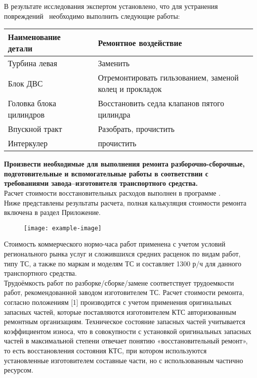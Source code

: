 %
%
%
В результате исследования   экспертом установлено, что для устранения повреждений  \, необходимо  выполнить следующие  работы:
\begin{center}
	\begin{tabulary}{\textwidth}{LCL}
\hline 
\textbf{Наименование детали}      &   & \textbf{Ремонтное воздействие}\\
\hline    
Турбина левая     &   &    Заменить\\
Блок ДВС    &   &    Отремонтировать гильзованием, заменой колец и прокладок \\
Головка блока цилиндров & & Восстановить седла клапанов пятого цилиндра \\
Впускной тракт & &    Разобрать, прочистить\\
Интеркулер   & &     прочистить\\
 

	\end{tabulary}  
\end{center}
\renewcommand\baselinestretch{1.2}\small\normalsize
%
\textbf{Произвести  необходимые для выполнения  ремонта разборочно-сборочные, подготовительные и вспомогательные работы в соответствии с требованиями завода–изготовителя транспортного средства.}\\
%
Расчет стоимости восстановительных расходов выполнен в программе \auda. \\ Ниже представлены результаты расчета, полная калькуляция стоимости ремонта включена в раздел Приложение.
\begin{figure}[H]
	\centering
	\texttt{[image: example-image]}
\end{figure}
\medskip
Стоимость коммерческого нормо-часа работ применена  с учетом условий регионального рынка услуг и сложившихся средних расценок по видам работ, типу ТС, а также по маркам и моделям ТС  и   составляет  1300 р/ч для данного транспортного средства. \\
Трудоёмкость работ по разборке/сборке/замене  соответствует трудоемкости работ, рекомендованной заводом изготовителем ТС. 
Расчет стоимости ремонта, согласно положениям [1] производится с учетом  применения оригинальных запасных частей, которые поставляются изготовителем КТС авторизованным ремонтным организациям. Техническое состояние запасных частей учитывается коэффициентом износа, что в совокупности с установкой оригинальных запасных частей в максимальной степени отвечает понятию «восстановительный ремонт», то есть восстановления состояния КТС, при котором используются установленные изготовителем составные части, но с использованным частично ресурсом. 

